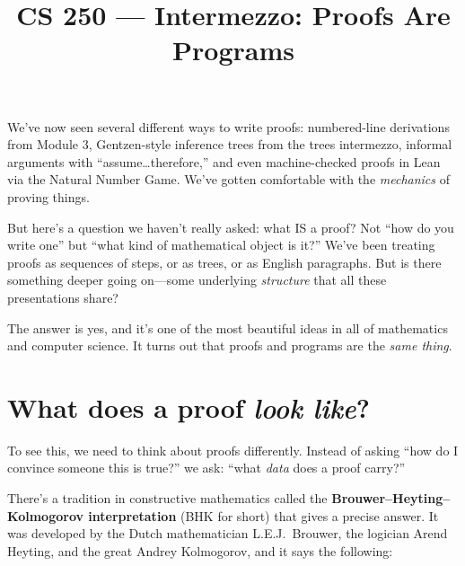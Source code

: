 \documentclass[11pt]{article}
\title{CS 250 --- Intermezzo: Proofs Are Programs}
\author{}
\date{}
\begin{document}
\maketitle

We've now seen several different ways to write proofs: numbered-line derivations from Module 3, Gentzen-style inference trees from the trees intermezzo, informal arguments with ``assume\ldots therefore,'' and even machine-checked proofs in Lean via the Natural Number Game. We've gotten comfortable with the \emph{mechanics} of proving things.

But here's a question we haven't really asked: what IS a proof? Not ``how do you write one'' but ``what kind of mathematical object is it?'' We've been treating proofs as sequences of steps, or as trees, or as English paragraphs. But is there something deeper going on---some underlying \emph{structure} that all these presentations share?

The answer is yes, and it's one of the most beautiful ideas in all of mathematics and computer science. It turns out that proofs and programs are the \emph{same thing}.

\section{What does a proof \emph{look like}?}

To see this, we need to think about proofs differently. Instead of asking ``how do I convince someone this is true?'' we ask: ``what \emph{data} does a proof carry?''

There's a tradition in constructive mathematics called the \textbf{Brouwer--Heyting--Kolmogorov interpretation} (BHK for short) that gives a precise answer. It was developed by the Dutch mathematician L.E.J.\ Brouwer, the logician Arend Heyting, and the great Andrey Kolmogorov, and it says the following:
\end{document}
